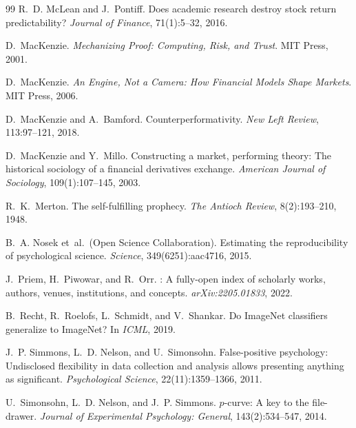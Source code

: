 \documentclass{article}
\begin{document}
\begin{thebibliography}{99}
R.~D. McLean and J.~Pontiff.
\newblock Does academic research destroy stock return predictability?
\newblock \emph{Journal of Finance}, 71(1):5--32, 2016.

D.~MacKenzie.
\newblock \emph{Mechanizing Proof: Computing, Risk, and Trust}.
\newblock MIT Press, 2001.

D.~MacKenzie.
\newblock \emph{An Engine, Not a Camera: How Financial Models Shape Markets}.
\newblock MIT Press, 2006.

D.~MacKenzie and A.~Bamford.
\newblock Counterperformativity.
\newblock \emph{New Left Review}, 113:97--121, 2018.

D.~MacKenzie and Y.~Millo.
\newblock Constructing a market, performing theory: The historical sociology of a financial derivatives exchange.
\newblock \emph{American Journal of Sociology}, 109(1):107--145, 2003.

R.~K.~Merton.
\newblock The self-fulfilling prophecy.
\newblock \emph{The Antioch Review}, 8(2):193--210, 1948.

B.~A. Nosek et~al.\ (Open Science Collaboration).
\newblock Estimating the reproducibility of psychological science.
\newblock \emph{Science}, 349(6251):aac4716, 2015.


J.~Priem, H.~Piwowar, and R.~Orr.
: A fully-open index of scholarly works, authors, venues, institutions, and concepts.
\newblock \emph{arXiv:2205.01833}, 2022.

B.~Recht, R.~Roelofs, L.~Schmidt, and V.~Shankar.
\newblock Do {ImageNet} classifiers generalize to {ImageNet}?
\newblock In \emph{ICML}, 2019.

J.~P. Simmons, L.~D. Nelson, and U.~Simonsohn.
\newblock False-positive psychology: Undisclosed flexibility in data collection and analysis allows presenting anything as significant.
\newblock \emph{Psychological Science}, 22(11):1359--1366, 2011.

U.~Simonsohn, L.~D. Nelson, and J.~P. Simmons.
\newblock $p$-curve: A key to the file-drawer.
\newblock \emph{Journal of Experimental Psychology: General}, 143(2):534--547, 2014.


\end{thebibliography}
\end{document}
